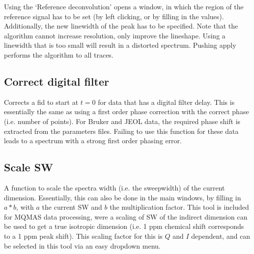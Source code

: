 \documentclass[11pt,a4paper]{article}
\begin{document}

Using the `Reference deconvolution' opens a window, in which the region of the reference signal has to be set (by left clicking, or by filling in the values). Additionally, the new linewidth of the peak has to be specified. Note that the algorithm cannot increase resolution, only improve the lineshape. Using a linewidth that is too small will result in a distorted spectrum. Pushing apply performs the algorithm to all traces.

\subsection{Correct digital filter}
Corrects a fid to start at $t=0$ for data that has a digital filter delay. This is essentially the
same as using a first order phase correction with the correct phase (i.e. number of points). For
Bruker and JEOL data, the required phase shift is extracted from the parameters files. Failing to
use this function for these data leads to a spectrum with a strong first order phasing error.


\subsection{Scale SW}
A function to scale the spectra width (i.e. the sweepwidth) of the current dimension. Essentially,
this can also be done in the main windows, by filling in $a * b$, with $a$ the current SW and $b$
the multiplication factor. This tool is included for MQMAS data processing, were a scaling of SW of the
indirect dimension can be used to get a true isotropic dimension (i.e. 1 ppm chemical shift
corresponds to a 1 ppm peak shift). This scaling factor for this is $Q$ and $I$ dependent, and can be selected in
this tool via an easy dropdown menu.
\end{document}
